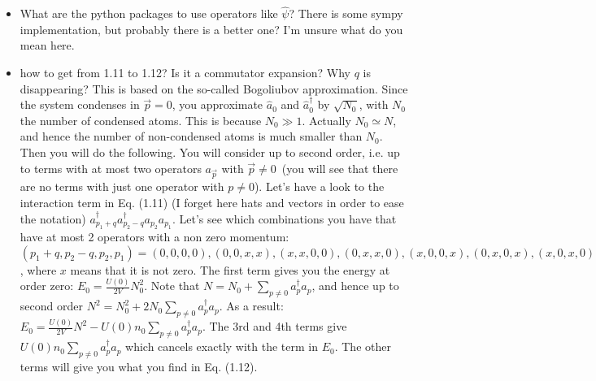 \begin{itemize}
        \item What are the python packages to use operators like $\hat{\psi}$? There is some sympy implementation, but probably there is a better one? 
        {\color{red} I'm unsure what do you mean here.}
               
        \item how to get from 1.11 to 1.12? Is it a commutator expansion? Why $q$ is disappearing?
        {\color{red} This is based on the so-called Bogoliubov approximation. Since the system condenses in $\vec p=0$, you approximate $\hat a_0$ and $\hat a^\dag_0$ by $\sqrt{N_0}$, 
        with $N_0$ the number of condensed atoms.  This is because $N_0\gg 1$. Actually $N_0\simeq N$, and hence the number of non-condensed atoms is much smaller than $N_0$. 
        Then you will do the following. You will consider up to second order, i.e. up to terms with at most two operators $a_{\vec p}$ with $\vec p\neq 0$~(you will see that there 
        are no terms with just one operator with $p\neq 0$). 
        Let's have a look to the interaction term in Eq. (1.11) (I forget here hats and vectors in order to ease the notation) $a^\dag_{p_1+q}a^\dag_{p_2-q}a_{p_2}a_{p_1}$. 
        Let's see which combinations you have that have at most 2 operators with a non zero momentum: 
        $(p_1+q,p_2-q,p_2,p_1)=(0,0,0,0), (0,0,x,x), (x,x,0,0), (0,x,x,0), (x,0,0,x), (0,x,0,x), (x,0,x,0)$, where $x$ means that it is not zero. The first term gives you the energy at order zero: $E_0=\frac{U(0)}{2V}N_0^2$. 
        Note that $N=N_0+\sum_{p\neq 0} a^\dag_pa_p$, and hence up to second order   $N^2=N_0^2+2N_0\sum_{p\neq 0} a^\dag_pa_p$. As a result:
        $E_0=\frac{U(0)}{2V}N^2 - U(0) n_0 \sum_{p\neq 0} a^\dag_pa_p$. 
        The 3rd and 4th terms give $U(0) n_0 \sum_{p\neq 0} a^\dag_pa_p$ which cancels exactly with the term in $E_0$. 
        The other terms will give you what you find in Eq. (1.12).}
        

\end{itemize}
